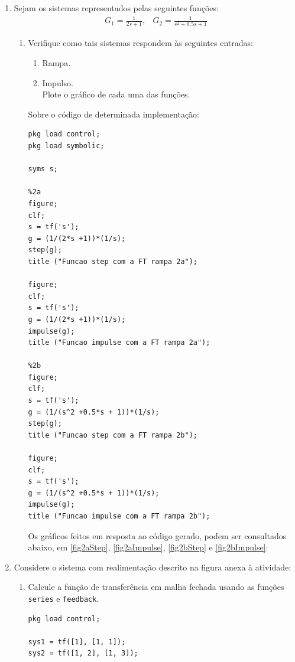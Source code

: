 \documentclass[a4paper,12pt]{article}
\begin{document}
\begin{enumerate}
        \item Sejam os sistemas representados pelas seguintes funções:
        \[
            \begin{array}{cc}
                G_1 = \frac{1}{2s + 1}, & G_2 = \frac{1}{s^2 + 0.5s + 1}
            \end{array}
        \]
        \begin{enumerate}
            \item Verifique como tais sistemas respondem às seguintes entradas:
            \begin{enumerate}
                \item Rampa.
                \item Impulso.
                \\
                Plote o gráfico de cada uma das funções.
            \end{enumerate}
            Sobre o código de determinada implementação:
            \begin{lstlisting}
pkg load control;
pkg load symbolic;

syms s;

%2a
figure;
clf;
s = tf('s');
g = (1/(2*s +1))*(1/s);
step(g);
title ("Funcao step com a FT rampa 2a");

figure;
clf;
s = tf('s');
g = (1/(2*s +1))*(1/s);
impulse(g);
title ("Funcao impulse com a FT rampa 2a");

%2b
figure;
clf;
s = tf('s');
g = (1/(s^2 +0.5*s + 1))*(1/s);
step(g);
title ("Funcao step com a FT rampa 2b");

figure;
clf;
s = tf('s');
g = (1/(s^2 +0.5*s + 1))*(1/s);
impulse(g);
title ("Funcao impulse com a FT rampa 2b");
            \end{lstlisting}
            Os gráficos feitos em resposta ao código gerado, podem ser consultados abaixo, em \ref{fig2aStep}, \ref{fig2aImpulse}, \ref{fig2bStep} e
            \ref{fig2bImpulse}:
        \end{enumerate}
        \item Considere o sistema com realimentação descrito na figura anexa à atividade:
        \begin{enumerate}
            \item Calcule a função de transferência em malha fechada usando as funções \texttt{series} e \texttt{feedback}.
            \begin{lstlisting}
pkg load control;

sys1 = tf([1], [1, 1]);
sys2 = tf([1, 2], [1, 3]);


\end{lstlisting}
\end{enumerate}
\end{enumerate}
\end{document}

